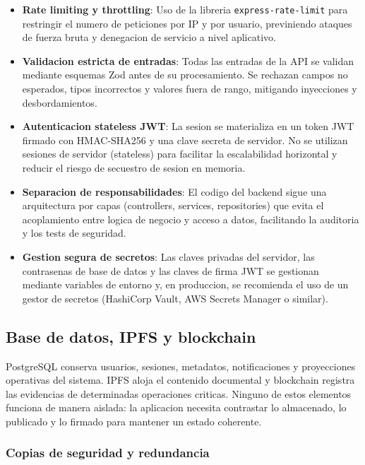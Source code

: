 \documentclass[11pt, a4paper]{article}
\begin{document}
\begin{itemize}
    \item \textbf{Rate limiting y throttling}: Uso de la libreria \texttt{express-rate-limit} para restringir el numero de peticiones por IP y por usuario, previniendo ataques de fuerza bruta y denegacion de servicio a nivel aplicativo.
    \item \textbf{Validacion estricta de entradas}: Todas las entradas de la API se validan mediante esquemas Zod antes de su procesamiento. Se rechazan campos no esperados, tipos incorrectos y valores fuera de rango, mitigando inyecciones y desbordamientos.
    \item \textbf{Autenticacion stateless JWT}: La sesion se materializa en un token JWT firmado con HMAC-SHA256 y una clave secreta de servidor. No se utilizan sesiones de servidor (stateless) para facilitar la escalabilidad horizontal y reducir el riesgo de secuestro de sesion en memoria.
    \item \textbf{Separacion de responsabilidades}: El codigo del backend sigue una arquitectura por capas (controllers, services, repositories) que evita el acoplamiento entre logica de negocio y acceso a datos, facilitando la auditoria y los tests de seguridad.
    \item \textbf{Gestion segura de secretos}: Las claves privadas del servidor, las contrasenas de base de datos y las claves de firma JWT se gestionan mediante variables de entorno y, en produccion, se recomienda el uso de un gestor de secretos (HashiCorp Vault, AWS Secrets Manager o similar).
\end{itemize}

\subsection{Base de datos, IPFS y blockchain}

PostgreSQL conserva usuarios, sesiones, metadatos, notificaciones y proyecciones operativas del sistema. IPFS aloja el contenido documental y blockchain registra las evidencias de determinadas operaciones criticas. Ninguno de estos elementos funciona de manera aislada: la aplicacion necesita contrastar lo almacenado, lo publicado y lo firmado para mantener un estado coherente.

\subsubsection{Copias de seguridad y redundancia}
\end{document}
